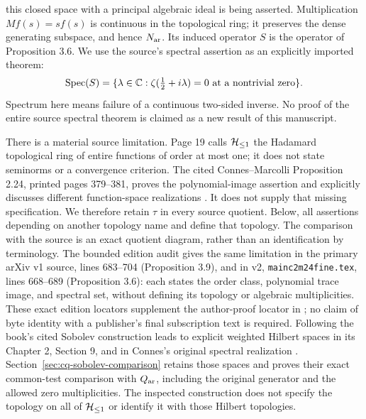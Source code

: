 this closed space with a principal algebraic ideal is being asserted.
Multiplication $M f(s)=sf(s)$ is continuous in the topological ring;
it preserves the dense generating subspace, and hence $N_{\rm ar}$.
Its induced operator $S$ is the operator of Proposition 3.6.
We use the source's spectral assertion as an explicitly imported theorem:
\begin{equation}\label{eq:cq-source-spectrum}
 \operatorname{Spec}(S)=\{\lambda\in\mathbb C:
             \zeta(\tfrac12+i\lambda)=0
             \text{ at a nontrivial zero}\}.
\end{equation}
Spectrum here means failure of a continuous two-sided inverse.
No proof of the entire source spectral theorem is claimed as a new
result of this manuscript.

There is a material source limitation. Page 19 calls $\mathcal H_{\leq 1}$ the
Hadamard topological ring of entire functions of order at most one;
it does not state seminorms or a convergence criterion. The cited
Connes--Marcolli Proposition 2.24, printed pages 379--381,
proves the polynomial-image assertion and explicitly discusses
different function-space realizations \cite{cqCM}. It does not supply
that missing specification. We therefore retain $\tau$ in every
source quotient. Below, all assertions depending on another topology
name and define that topology. The comparison with the source is an
exact quotient diagram, rather than an identification by terminology.
The bounded edition audit gives the same limitation in the primary
arXiv v1 source, lines 683--704 (Proposition 3.9), and in v2,
\texttt{mainc2m24fine.tex}, lines 668--689 (Proposition 3.6):
each states the order class, polynomial trace image, and spectral
set, without defining its topology or algebraic multiplicities.
These exact edition locators supplement the author-proof locator
in \cite{cqCCM}; no claim of byte identity with a publisher's final
subscription text is required.
Following the book's cited Sobolev construction leads to explicit
weighted Hilbert spaces in its Chapter 2, Section 9, and in
Connes's original spectral realization \cite{cqConnesSelecta}.
Section~\ref{sec:cq-sobolev-comparison} retains those spaces and
proves their exact common-test comparison with $Q_{\rm ar}$, including
the original generator and the allowed zero multiplicities.
The inspected construction does not specify the topology on all
of $\mathcal H_{\leq 1}$ or identify it with those Hilbert topologies.

